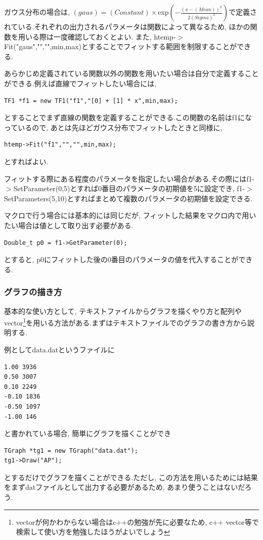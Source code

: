 ガウス分布の場合は, $(gaus)=(Constant)\times$exp$(-\frac{(x-(Mean))^2}{2(Sigma)^2})$で定義されている.それぞれの出力されるパラメータは関数によって異なるため, ほかの関数を用いる際は一度確認しておくとよい.
また, htemp-$>$Fit("gaus","","",min,max)とすることでフィットする範囲を制限することができる.

あらかじめ定義されている関数以外の関数を用いたい場合は自分で定義することができる.例えば直線でフィットしたい場合には, 
\begin{lstlisting}
TF1 *f1 = new TF1("f1","[0] + [1] * x",min,max);
 \end{lstlisting}
とすることでまず直線の関数を定義することができる.この関数の名前はf1になっているので, あとは先ほどガウス分布でフィットしたときと同様に, 
\begin{lstlisting}
htemp->Fit("f1","","",min,max);
 \end{lstlisting}
とすればよい.

フィットする際にある程度のパラメータを指定したい場合がある.その際にはf1-$>$SetParameter(0,5)とすれば0番目のパラメータの初期値を5に設定でき, f1-$>$SetParameters(5,10)とすればまとめて複数のパラメータの初期値を設定できる.

マクロで行う場合には基本的には同じだが, フィットした結果をマクロ内で用いたい場合は値として取り出す必要がある.
\begin{lstlisting}
Double_t p0 = f1->GetParameter(0);
 \end{lstlisting}
とすると, p0にフィットした後の0番目のパラメータの値を代入することができる.

\subsubsection{グラフの描き方}
基本的な使い方として, テキストファイルからグラフを描くやり方と配列やvector\footnote{vectorが何かわからない場合はc++の勉強が先に必要なため, c++ vector等で検索して使い方を勉強したほうがよいでしょう}を用いる方法がある.まずはテキストファイルでのグラフの書き方から説明する.

例としてdata.datというファイルに
\begin{lstlisting}
1.00 3936
0.50 3007
0.10 2249
-0.10 1836
-0.50 1097
-1.00 146
 \end{lstlisting}
と書かれている場合, 簡単にグラフを描くことができ
\begin{lstlisting}
TGraph *tg1 = new TGraph("data.dat");
tg1->Draw("AP");
 \end{lstlisting}
とするだけでグラフを描くことができる.ただし, この方法を用いるためには結果をまずdatファイルとして出力する必要があるため, あまり使うことはないだろう.

